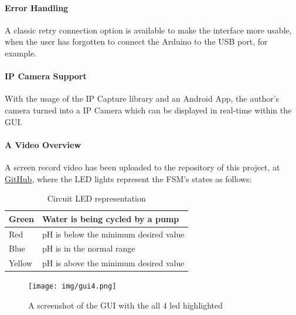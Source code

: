 \paragraph{Error Handling}

A classic retry connection option is available to make the interface more usable,
when the user has forgotten to connect the Arduino to the USB port,
for example.

\paragraph{IP Camera Support}
With the usage of the IP Capture library \cite{ipcapture_2016} and an Android App,
the author's camera turned into a IP Camera which can be displayed in real-time within the GUI.


\paragraph{A Video Overview}
\label{sec:video}
A screen record video has been uploaded to the repository of this project,
at \href{https://raw.githubusercontent.com/gagallo7/ArduinoAquaponics/master/demo.webm}{GitHub},
where the LED lights represent the FSM's states as follows:

\begin{table}
    \centering
    \caption{Circuit LED representation}

    \begin{tabular}[h]{|l|l|}
        \hline
        Green   & Water is being cycled by a pump
        \\\hline
        Red     & pH is below the minimum desired value
        \\\hline
        Blue    & pH is in the normal range
        \\\hline
        Yellow  & pH is above the minimum desired value
        \\\hline

    \end{tabular}
\end{table}

\begin{figure}[h]
    \centering
    \texttt{[image: img/gui4.png]}
    \caption{A screenshot of the GUI with the all 4 led highlighted}
    \label{fig:g4p}
\end{figure}
